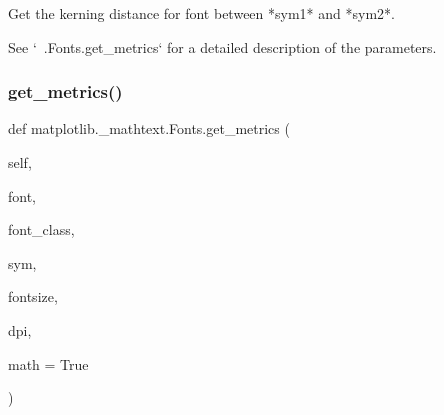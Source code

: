 \begin{DoxyVerb}Get the kerning distance for font between *sym1* and *sym2*.

See `~.Fonts.get_metrics` for a detailed description of the parameters.
\end{DoxyVerb}
 \mbox{\label{classmatplotlib_1_1__mathtext_1_1Fonts_ab792d9a1b3dcd8bf87b2a2ed68c4887e}} 
\subsubsection{\texorpdfstring{get\+\_\+metrics()}{get\_metrics()}}
{\footnotesize\ttfamily def matplotlib.\+\_\+mathtext.\+Fonts.\+get\+\_\+metrics (\begin{DoxyParamCaption}\item[{}]{self,  }\item[{}]{font,  }\item[{}]{font\+\_\+class,  }\item[{}]{sym,  }\item[{}]{fontsize,  }\item[{}]{dpi,  }\item[{}]{math = {\ttfamily True} }\end{DoxyParamCaption})}


